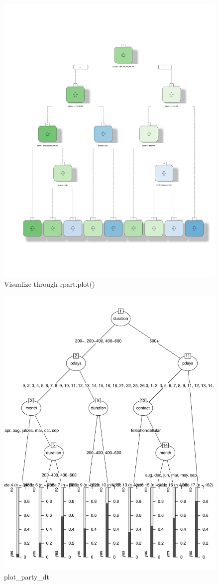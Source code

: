 \documentclass[12pt, a4paper, bibliography=totoc, english]{scrartcl}
\begin{document}
\begin{figure}
	\centering
	\includegraphics[width=0.7\linewidth]{part-lot_dt}
	\caption{Visualize through rpart.plot()}
	\label{fig:part-lotdt}
\end{figure}

\begin{figure}
	\centering
	\includegraphics[width=0.7\linewidth]{plot_party_dt}
	\caption{plot\_party\_dt}
	\label{fig:plotpartydt}
\end{figure}
\end{document}
